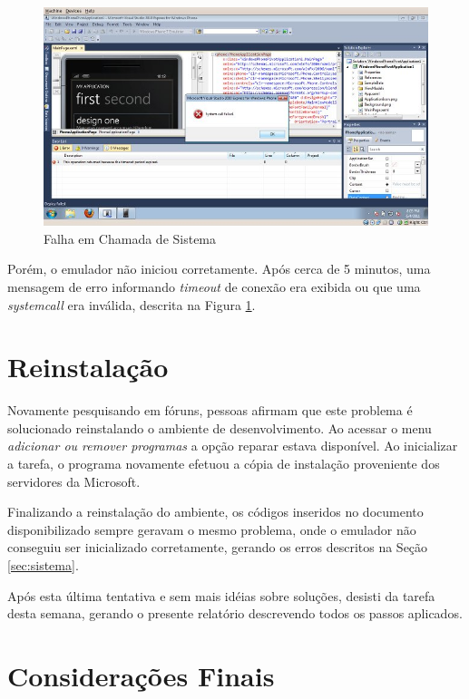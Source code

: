 \documentclass{article}
\begin{document}
\begin{figure}
    \centering{}
    \includegraphics[width=\textwidth]{system-call-failed}
    \caption{Falha em Chamada de Sistema}
    \label{fig:system-call-failed}
\end{figure}

Porém, o emulador não iniciou corretamente. Após cerca de 5 minutos, uma
mensagem de erro informando \textit{timeout} de conexão era exibida ou que uma
\textit{systemcall} era inválida, descrita na Figura
\ref{fig:system-call-failed}.

\section{Reinstalação}
\label{sec:reinstalacao}

Novamente pesquisando em fóruns, pessoas afirmam que este problema é solucionado
reinstalando o ambiente de desenvolvimento. Ao acessar o menu \textit{adicionar
ou remover programas} a opção reparar estava disponível. Ao inicializar a
tarefa, o programa novamente efetuou a cópia de instalação proveniente dos
servidores da Microsoft.

Finalizando a reinstalação do ambiente, os códigos inseridos no documento
disponibilizado sempre geravam o mesmo problema, onde o emulador não conseguiu
ser inicializado corretamente, gerando os erros descritos na Seção
\ref{sec:sistema}.

Após esta última tentativa e sem mais idéias sobre soluções, desisti da tarefa
desta semana, gerando o presente relatório descrevendo todos os passos
aplicados.

\section{Considerações Finais}
\label{sec:consideracoes}
\end{document}
